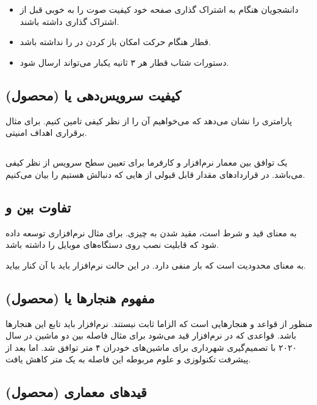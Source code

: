 \begin{itemize}
    \item دانشجویان هنگام به اشتراک گذاری صفحه خود کیفیت صوت را به خوبی قبل از
    اشتراک گذاری داشته باشند.
    \item قطار هنگام حرکت امکان باز کردن در را نداشته باشد.
    \item دستورات شتاب قطار هر ۳ ثانیه یکبار می‌تواند ارسال شود.
\end{itemize}

\subsection{کیفیت سرویس‌دهی یا  (محصول)}

پارامتری را نشان می‌دهد که می‌خواهیم آن را از نظر کیفی تامین کنیم. برای مثال
برقراری اهداف امنیتی.

\subsection{}

یک توافق بین معمار نرم‌افزار و کارفرما برای تعیین سطح سرویس از نظر کیفی می‌باشد.
در قرار‌داد‌های  مقدار قابل قبولی از هایی که دنبالش هستیم را
بیان می‌کنیم.

\subsection{تفاوت بین  و }

 به معنای قید و شرط است، مقید شدن به چیزی. برای مثال نرم‌افزاری
توسعه داده شود که قابلیت نصب روی دستگاه‌های موبایل را داشته باشد.

 به معنای محدودیت است که بار منفی دارد. در این حالت نرم‌افزار
باید با آن کنار بیاید.

\subsection{مفهوم هنجار‌ها یا  (محصول)}

منظور از  قواعد و هنجار‌هایی است که الزاما ثابت نیستند. نرم‌افزار
باید تابع این هنجار‌ها باشد. قواعدی که در نرم‌افزار قید می‌شود برای مثال فاصله
بین دو ماشین در سال ۲۰۲۰ با تصمیم‌گیری شهرداری برای ماشین‌های خودران ۴ متر توافق
شد. اما بعد از پیشرفت تکنولوزی و علوم مربوطه این فاصله به یک متر کاهش یافت.

\subsection{قید‌های معماری  (محصول)}

